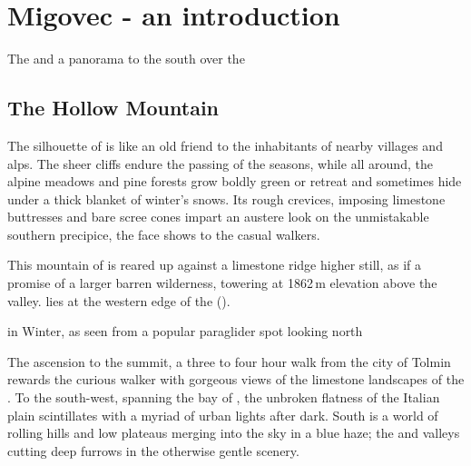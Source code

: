 \chapter{Migovec - an introduction}
\begin{marginfigure}
\checkoddpage \ifoddpage \forcerectofloat \else \forceversofloat \fi
\centering
\vspace{50pt}
 \caption{The \protect{} and a panorama to the south over the \protect{} }
 \label{dinarides}
\end{marginfigure}

\section{The Hollow Mountain}
The silhouette of  is like an old friend to the inhabitants of nearby villages and alps. The sheer cliffs endure the passing of the seasons, while all around, the alpine meadows and pine forests grow boldly green or retreat and sometimes hide under a thick blanket of winter's snows. Its rough crevices, imposing limestone buttresses and bare scree cones impart an austere look on the unmistakable southern precipice, the face  shows to the casual walkers.

This mountain of  is reared up against a limestone ridge higher still, as if a promise of a larger barren wilderness, towering at 1862\,m elevation above the  valley.  lies at the western edge of the  (). 


 \begin{pagefigure}
 \checkoddpage \ifoddpage \forcerectofloat \else \forceversofloat \fi
\centering
  \label{winter panorama migovec}
  \caption{\protect{} in Winter, as seen from a popular paraglider spot looking north }
 \end{pagefigure}

The ascension to the summit, a three to four hour walk from the city of Tolmin rewards the curious walker with gorgeous views of the limestone landscapes of the . To the south-west, spanning the bay of , the unbroken flatness of the Italian plain scintillates with a myriad of urban lights after dark. South is a world of rolling hills and low plateaus merging into the sky in a blue haze; the  and  valleys cutting deep furrows in the otherwise gentle scenery. 

